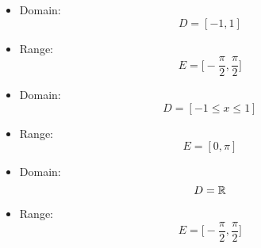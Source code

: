                 \begin{itemize}
                    \item Domain:
                        \begin{equation}
                            D = [-1, 1]
                        \end{equation}
                    \item Range: 
                        \begin{equation}
                            E = \big[-\dfrac{\pi}{2}, \dfrac{\pi}{2}\big]
                        \end{equation}
                \end{itemize}
                \begin{itemize}
                    \item Domain:
                        \begin{equation}
                            D = [-1 \leq x \leq 1]
                        \end{equation}
                    \item Range:
                        \begin{equation}
                            E = [0, \pi]
                        \end{equation}
                \end{itemize}
                \begin{itemize}
                    \item Domain:
                        \begin{equation}
                            D = \mathbb{R}
                        \end{equation}
                    \item Range:
                        \begin{equation}
                            E = \big[-\dfrac{\pi}{2}, \dfrac{\pi}{2}\big]
                        \end{equation}
                \end{itemize}
        \hiiiEND
    \hiiEND

